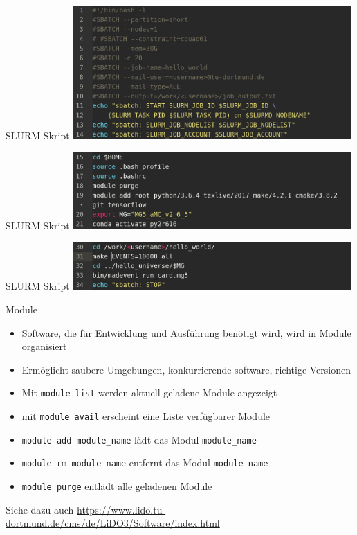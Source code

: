 \begin{frame}{SLURM Skript}
  \centering
  \includegraphics[width=0.8\textwidth]{figs/slurm_oben.png}
\end{frame}

\begin{frame}{SLURM Skript}
  \centering
  \includegraphics[width=0.8\textwidth]{figs/slurm_software.png}
\end{frame}

\begin{frame}{SLURM Skript}
  \centering
  \includegraphics[width=0.8\textwidth]{figs/slurm_end.png}
\end{frame}

\begin{frame}{Module}
  \begin{itemize}
    \item Software, die für Entwicklung und Ausführung benötigt wird, wird in Module organisiert
    \item Ermöglicht saubere Umgebungen, konkurrierende software, richtige Versionen
    \item Mit \texttt{module list} werden aktuell geladene Module angezeigt
    \item mit \texttt{module avail} erscheint eine Liste verfügbarer Module
    \item \texttt{module add module\_name} lädt das Modul \texttt{module\_name}
    \item \texttt{module rm module\_name} entfernt das Modul \texttt{module\_name}
    \item \texttt{module purge} entlädt alle geladenen Module
  \end{itemize}
  Siehe dazu auch \url{https://www.lido.tu-dortmund.de/cms/de/LiDO3/Software/index.html}
\end{frame}

